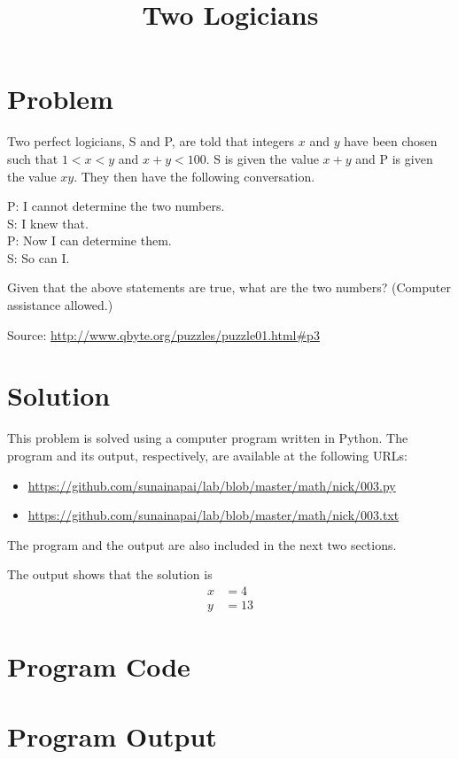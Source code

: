 \documentclass{article}
\title{Two Logicians}
\begin{document}
\maketitle


\section*{Problem}
Two perfect logicians, S and P, are told that integers \( x \) and \( y \)
have been chosen such that \( 1 < x < y \) and \( x + y < 100 \). S is
given the value \( x + y \) and P is given the value \( xy \). They then
have the following conversation.

\setlength{\leftskip}{2em}
P:  I cannot determine the two numbers. \\
S:  I knew that. \\
P:  Now I can determine them. \\
S:  So can I.
\setlength{\leftskip}{0em}

Given that the above statements are true, what are the two numbers?
(Computer assistance allowed.)

Source: \url{http://www.qbyte.org/puzzles/puzzle01.html#p3}


\section*{Solution}
This problem is solved using a computer program written in Python. The
program and its output, respectively, are available at the following
URLs:
\begin{itemize}
\item \url{https://github.com/sunainapai/lab/blob/master/math/nick/003.py}
\item \url{https://github.com/sunainapai/lab/blob/master/math/nick/003.txt}
\end{itemize}

The program and the output are also included in the next two sections.

The output shows that the solution is
\begin{align*}
x & = 4 \\
y & = 13
\end{align*}
\pagebreak


\section*{Program Code}
\lstset{language=Python,basicstyle=\small\ttfamily,columns=fullflexible,keepspaces,breaklines}



\section*{Program Output}
\lstset{language=}

\end{document}

